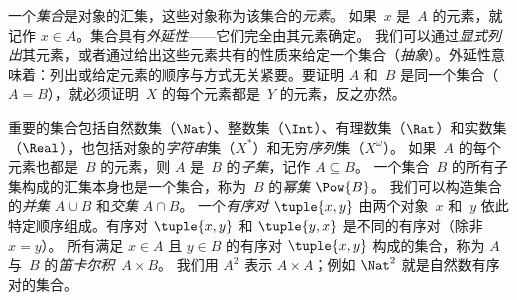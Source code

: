 一个\emph{集合}是对象的汇集，这些对象称为该集合的\emph{元素}。
如果~$x$ 是~$A$ 的元素，就记作 $x \in A$。集合具有\emph{外延性}——它们完全由其元素确定。
我们可以通过\emph{显式列出}其元素，或者通过给出这些元素共有的性质来给定一个集合（\emph{抽象}）。外延性意味着：列出或给定元素的顺序与方式无关紧要。要证明 $A$ 和~$B$ 是同一个集合（$A = B$），就必须证明~$X$ 的每个元素都是~$Y$ 的元素，反之亦然。

重要的集合包括自然数集（$\Nat$）、整数集（$\Int$）、有理数集（$\Rat$）和实数集（$\Real$），也包括对象的\emph{字符串}集（$X^*$）和无穷\emph{序列}集（$X^\omega$）。
如果~$A$ 的每个元素也都是~$B$ 的元素，则 $A$ 是~$B$ 的\emph{子集}，记作 $A \subseteq B$。
一个集合~$B$ 的所有子集构成的汇集本身也是一个集合，称为~$B$ 的\emph{幂集} $\Pow{B}$。
我们可以构造集合的\emph{并集} $A \cup B$ 和\emph{交集} $A \cap B$。
一个\emph{有序对} $\tuple{x, y}$ 由两个对象~$x$ 和~$y$ 依此特定顺序组成。有序对 $\tuple{x, y}$ 和 $\tuple{y, x}$ 是不同的有序对（除非 $x = y$）。
所有满足 $x \in A$ 且 $y \in B$ 的有序对 $\tuple{x, y}$ 构成的集合，称为 $A$ 与~$B$ 的\emph{笛卡尔积}~$A \times B$。
我们用 $A^2$ 表示 $A \times A$；例如 $\Nat^2$ 就是自然数有序对的集合。